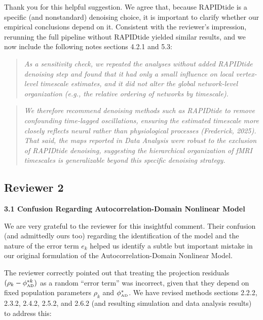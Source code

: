 \documentclass[docs/main.tex]{subfiles}
\newcommand{\reviewercomment}[1]{\vspace{0.3cm}\noindent\textbf{#1}\vspace{0.15cm}}
\newcommand{\manuscriptquote}[1]{\begin{quote}\textit{#1}\end{quote}}
\begin{document}
Thank you for this helpful suggestion. We agree that, because RAPIDtide is a specific (and nonstandard) denoising choice, it is important to clarify whether our empirical conclusions depend on it. Consistent with the reviewer’s impression, rerunning the full pipeline without RAPIDtide yielded similar results, and we now include the following notes sections 4.2.1 and 5.3:

\manuscriptquote{As a sensitivity check, we repeated the analyses without added RAPIDtide denoising step and found that it had only a small influence on local vertex-level timescale estimates, and it did not alter the global network-level organization (e.g., the relative ordering of networks by timescale).}

\manuscriptquote{We therefore recommend denoising methods such as RAPIDtide to remove confounding time-lagged oscillations, ensuring the estimated timescale more closely reflects neural rather than physiological processes (Frederick, 2025). That said, the maps reported in Data Analysis were robust to the exclusion of RAPIDtide denoising, suggesting the hierarchical organization of fMRI timescales is generalizable beyond this specific denoising strategy.}

\subsection*{Reviewer 2}

\reviewercomment{3.1 Confusion Regarding Autocorrelation-Domain Nonlinear Model}

We are very grateful to the reviewer for this insightful comment. Their confusion (and admittedly ours too) regarding the identification of the model and the nature of the error term $e_k$ helped us identify a subtle but important mistake in our original formulation of the Autocorrelation-Domain Nonlinear Model.

The reviewer correctly pointed out that treating the projection residuals $(\rho_k - \phi_{\scriptscriptstyle\text{AD}}^{*k})$ as a random ``error term'' was incorrect, given that they depend on fixed population parameters $\rho_k$ and $\phi_{\scriptscriptstyle\text{AD}}^*$. We have revised methods sections 2.2.2, 2.3.2, 2.4.2, 2.5.2, and 2.6.2 (and resulting simulation and data analysis results) to address this:
\end{document}

